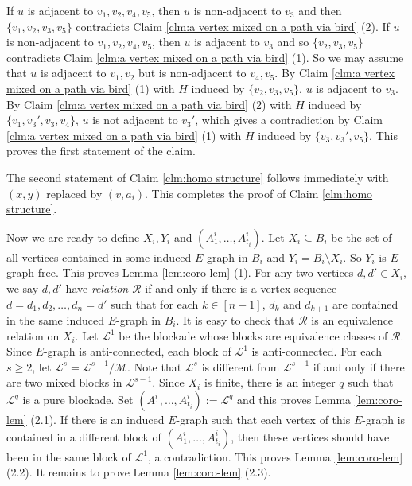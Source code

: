 \documentclass[a4paper,11pt]{article}
\let\oldendproof\endproof
\renewenvironment{proof}[1][\proofname]{%
	\oldproof[\normalfont\bfseries #1]%
}{\oldendproof}
\renewcommand{\qedsymbol}{$\square$}%
\newenvironment{subproof}[1][\normalfont\it Subproof]{%
	\renewcommand{\qedsymbol}{{\tiny{$\blacksquare$}}}%
	\begin{proof}[#1]%
	}{%
	\end{proof}%
}
\begin{document}
\begin{proof}
\begin{subproof}[Proof of Claim \ref{clm:homo structure}]
            If $u$ is adjacent to $v_1,v_2,v_4,v_5$, then $u$ is non-adjacent to $v_3$ and then $\{v_1,v_2,v_3,v_5\}$ contradicts Claim \ref{clm:a vertex mixed on a path via bird} (2).
            If $u$ is non-adjacent to $v_1,v_2,v_4,v_5$, then $u$ is adjacent to $v_3$ and so $\{v_2,v_3,v_5\}$ contradicts Claim \ref{clm:a vertex mixed on a path via bird} (1).
            So we may assume that $u$ is adjacent to $v_1,v_2$ but is non-adjacent to $v_4,v_5$. 
            By Claim \ref{clm:a vertex mixed on a path via bird} (1) with $H$ induced by $\{v_2,v_3,v_5\}$, $u$ is adjacent to $v_3$. 
            By Claim \ref{clm:a vertex mixed on a path via bird} (2) with $H$ induced by $\{v_1,v_3',v_3,v_4\}$, $u$ is not adjacent to $v_3'$, which gives a contradiction by Claim \ref{clm:a vertex mixed on a path via bird} (1) with $H$ induced by $\{v_3,v_3',v_5\}$. 
            This proves the first statement of the claim.
            
            The second statement of Claim \ref{clm:homo structure} follows immediately with $(x,y)$ replaced by $(v,a_i)$. 
            This completes the proof of Claim \ref{clm:homo structure}. 
        \end{subproof}
        
        Now we are ready to define $X_i,Y_i$ and $(A^i_1,\ldots, A^i_{t_i})$. 
        Let $X_i\subseteq B_i$ be the set of all vertices contained in some induced $E$-graph in $B_i$ and $Y_i=B_i\setminus X_i$. So $Y_i$ is $E$-graph-free.   
        This proves Lemma \ref{lem:coro-lem} (1). 
        For any two vertices $d,d'\in X_i$, we say $d,d'$ have {\em relation $\mathcal{R}$} if and only if there is a vertex sequence $d=d_1,d_2,\ldots,d_n=d'$ such that for each $k\in [n-1]$, $d_k$ and $d_{k+1}$ are contained in the same induced $E$-graph in $B_i$. 
        It is easy to check that $\mathcal{R}$ is an equivalence relation on $X_i$. 
        Let $\mathcal{L}^1$ be the blockade whose blocks are equivalence classes of $\mathcal{R}$. 
        Since $E$-graph is anti-connected, each block of $\mathcal{L}^1$ is anti-connected. 
        For each $s\geq 2$, let $\mathcal{L}^{s}=\mathcal{L}^{s-1}/\mathcal{M}$. 
        Note that $\mathcal{L}^{s}$ is different from $\mathcal{L}^{s-1}$ if and only if there are two mixed blocks in $\mathcal{L}^{s-1}$.
        Since $X_i$ is finite, there is an integer $q$ such that $\mathcal{L}^{q}$ is a pure blockade. 
        Set $(A^i_1,\ldots, A^i_{t_i}):=\mathcal{L}^{q}$ and  
        this proves Lemma \ref{lem:coro-lem} (2.1). 
        If there is an induced $E$-graph such that each vertex of this $E$-graph is contained in a different block of $(A^i_1,\ldots,A^i_{t_i})$, then these vertices should have been in the same block of $\mathcal{L}^1$, a contradiction. 
        This proves Lemma \ref{lem:coro-lem} (2.2).
        It remains to prove Lemma \ref{lem:coro-lem} (2.3).
      

\end{proof}
\end{document}
